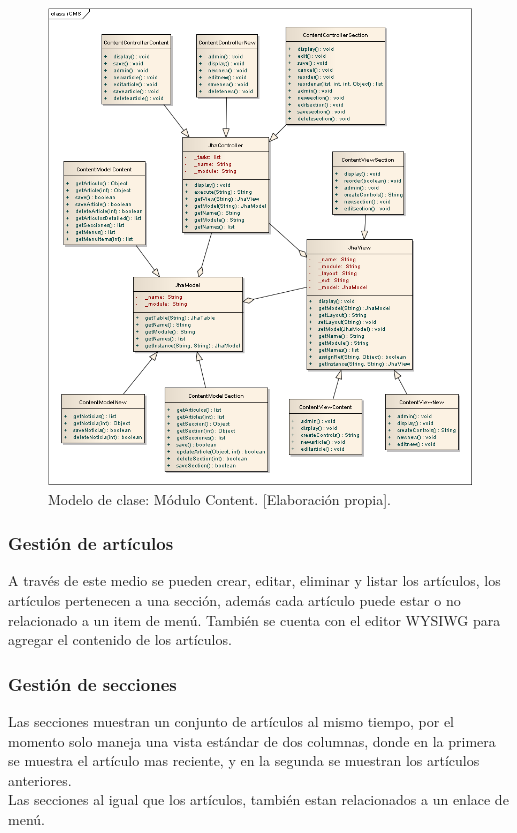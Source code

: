\begin{figure}[h]
\centering
\includegraphics[scale=.4, keepaspectratio=true]{imagenes/14_imagen.png}
\caption{Modelo de clase: M\'odulo Content. [Elaboraci\'on propia].}
\end{figure}

\subsubsection{Gesti\'on de art\'iculos}
A trav\'es de este medio se pueden crear, editar, eliminar y listar los art\'iculos, los art\'iculos pertenecen a una secci\'on, adem\'as cada art\'iculo puede estar o no relacionado a un item de men\'u. Tambi\'en se cuenta con el editor WYSIWG para agregar el contenido de los art\'iculos.

\subsubsection{Gesti\'on de secciones}
Las secciones muestran un conjunto de art\'iculos al mismo tiempo, por el momento solo maneja una vista est\'andar de dos columnas, donde en la primera se muestra el art\'iculo mas reciente, y en la segunda se muestran los art\'iculos anteriores.\\
Las secciones al igual que los art\'iculos, tambi\'en estan relacionados a un enlace de men\'u.

